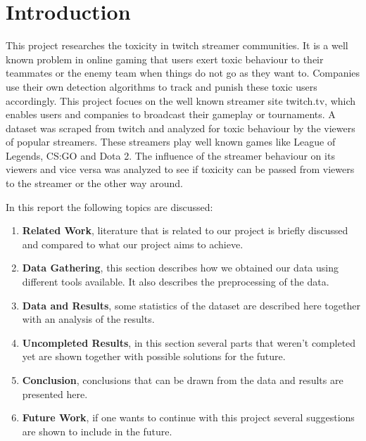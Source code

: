 \documentclass[final]{report}
\begin{document}
\chapter{Introduction}
\label{ch:introduction}

This project researches the toxicity in twitch streamer communities.
It is a well known problem in online gaming that users exert toxic behaviour to their teammates or the enemy team when things do not go as they want to.
Companies use their own detection algorithms to track and punish these toxic users accordingly.
This project focues on the well known streamer site twitch.tv, which enables users and companies to broadcast their gameplay or tournaments.
A dataset was scraped from twitch and analyzed for toxic behaviour by the viewers of popular streamers.
These streamers play well known games like League of Legends, CS:GO and Dota 2.
The influence of the streamer behaviour on its viewers and vice versa was analyzed to see if toxicity can be passed from viewers to the streamer or the other way around.

In this report the following topics are discussed:
\begin{enumerate}
	\item \textbf{Related Work}, literature that is related to our project is briefly discussed and compared to what our project aims to achieve.
	\item \textbf{Data Gathering}, this section describes how we obtained our data using different tools available. It also describes the preprocessing of the data.
	\item \textbf{Data and Results}, some statistics of the dataset are described here together with an analysis  of the results.
	\item \textbf{Uncompleted Results}, in this section several parts that weren't completed yet are shown together with possible solutions for the future.
	\item \textbf{Conclusion}, conclusions that can be drawn from the data and results are presented here.
	\item \textbf{Future Work}, if one wants to continue with this project several suggestions are shown to include in the future.
\end{enumerate}
\end{document}
